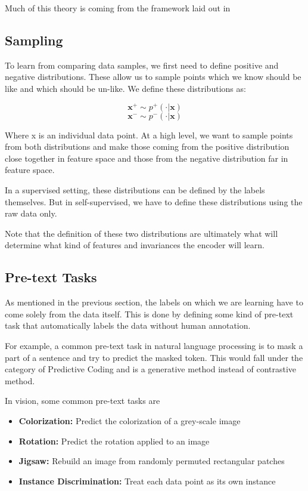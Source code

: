 \documentclass[12pt]{article}
\begin{document}
Much of this theory is coming from the framework laid out in \cite{le-khac_contrastive_2020}

\subsection{Sampling}

To learn from comparing data samples, we first need to define positive and negative distributions. These allow us to sample points which we know should be like and which should be un-like. We define these distributions as:
%

$$\mathbf{x}^{+} \sim p^{+}( \cdot | \mathbf{x})$$
$$\mathbf{x}^{-} \sim p^{-}( \cdot | \mathbf{x})$$

Where x is an individual data point. At a high level, we want to sample points from both distributions and make those coming from the positive distribution close together in feature space and those from the negative distribution far in feature space.
%

In a supervised setting, these distributions can be defined by the labels themselves. But in self-supervised, we have to define these distributions using the raw data only.
%

Note that the definition of these two distributions are ultimately what will determine what kind of features and invariances the encoder will learn.
%

\subsection{Pre-text Tasks}

As mentioned in the previous section, the labels on which we are learning have to come solely from the data itself. This is done by defining some kind of pre-text task that automatically labels the data without human annotation.
%

For example, a common pre-text task in natural language processing is to mask a part of a sentence and try to predict the masked token. This would fall under the category of Predictive Coding \cite{oord_representation_2019} and is a generative method instead of contrastive method.
%

In vision, some common pre-text tasks are
\begin{itemize}
    \item \textbf{Colorization:} Predict the colorization of a grey-scale image
    \item \textbf{Rotation:} Predict the rotation applied to an image
    \item \textbf{Jigsaw:} Rebuild an image from randomly permuted rectangular patches
    \item \textbf{Instance Discrimination:} Treat each data point as its own instance
\end{itemize}
%
\end{document}
